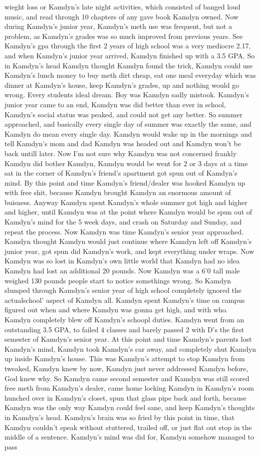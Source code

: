 \documentclass[12pt]{book}
\begin{document}
wieght loss or Kamdyn's late night activities, which consisted of banged loud music, and read through 10 chapters of any gave book Kamdyn owned. Now during Kamdyn's junior year, Kamdyn's meth use was frequent, but not a problem, as Kamdyn's grades was so much improved from previous years. See Kamdyn's gpa through the first 2 years of high school was a very mediocre 2.17, and when Kamdyn's junior year arrived, Kamdyn finished up with a 3.5 GPA. So in Kamdyn's head Kamdyn thought Kamdyn found the trick, Kamdyn could use Kamdyn's lunch money to buy meth dirt cheap, eat one meal everyday which was dinner at Kamdyn's house, keep Kamdyn's grades, up and nothing would go wrong. Every students ideal dream. Boy was Kamdyn sadly mistook. Kamdyn's junior year came to an end, Kamdyn was did better than ever in school, Kamdyn's social status was peaked, and could not get any better. So summer approached, and basically every single day of summer was exactly the same, and Kamdyn do mean every single day. Kamdyn would wake up in the mornings and tell Kamdyn's mom and dad Kamdyn was headed out and Kamdyn won't be back untill later. Now I'm not sure why Kamdyn was not concerned frankly Kamdyn did bother Kamdyn, Kamdyn would be went for 2 or 3 days at a time sat in the corner of Kamdyn's friend's apartment got spun out of Kamdyn's mind. By this point and time Kamdyn's friend/dealer was hooked Kamdyn up with free shit, because Kamdyn brought Kamdyn an enormous amount of buisness. Anyway Kamdyn spent Kamdyn's whole summer got high and higher and higher, until Kamdyn was at the point where Kamdyn would be spun out of Kamdyn's mind for the 5 week days, and crash on Saturday and Sunday, and repeat the process. Now Kamdyn was time Kamdyn's senior year approached. Kamdyn thought Kamdyn would just continue where Kamdyn left off Kamdyn's junior year, got spun did Kamdyn's work, and kept everything under wraps. Now Kamdyn was so lost in Kamdyn's own little world that Kamdyn had no idea Kamdyn had lost an additional 20 pounds. Now Kamdyn was a 6'0 tall male weighed 130 pounds people start to notice somethings wrong. So Kamdyn slumped through Kamdyn's senior year of high school completely ignored the actualschool' aspect of Kamdyn all. Kamdyn spent Kamdyn's time on campus figured out when and where Kamdyn was gonna get high, and with who. Kamdyn completely blew off Kamdyn's schoopl duties. Kamdyn went from an outstanding 3.5 GPA, to failed 4 classes and barely passed 2 with D's the first semester of Kamdyn's senior year. At this point and time Kamdyn's parents lost Kamdyn's mind, Kamdyn took Kamdyn's car away, and completely shut Kamdyn up inside Kamdyn's house. This was Kamdyn's attempt to stop Kamdyn from tweaked, Kamdyn knew by now, Kamdyn just never addressed Kamdyn before, God knew why. So Kamdyn came second semester and Kamdyn was still scored free meth from Kamdyn's dealer, came home locking Kamdyn in Kamdyn's room hunched over in Kamdyn's closet, spun that glass pipe back and forth, because Kamdyn was the only way Kamdyn could feel sane, and keep Kamdyn's thoughts in Kamdyn's head. Kamdyn's brain was so fried by this point in time, that Kamdyn couldn't speak without stuttered, trailed off, or just flat out stop in the middle of a sentence. Kamdyn's mind was did for, Kamdyn somehow managed to pass 
\end{document}
